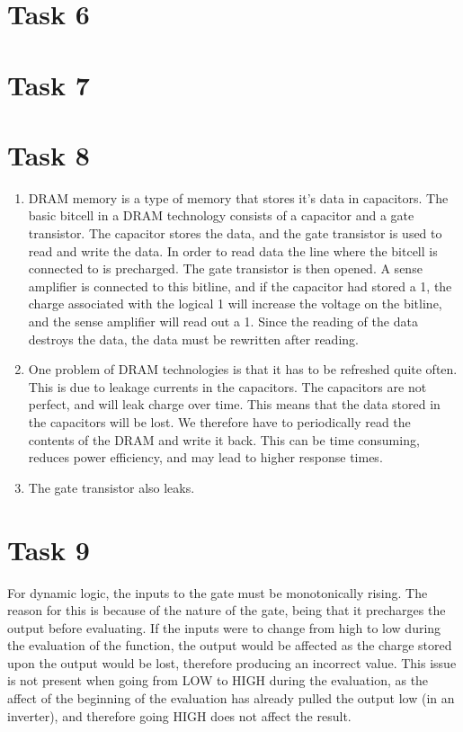 \documentclass[a4paper,11pt,norsk]{article}
\begin{document}
\section*{Task 6}

\section*{Task 7}

\section*{Task 8}
\begin{enumerate}
    \item DRAM memory is a type of memory that stores it's data in capacitors. The basic bitcell in a DRAM technology 
        consists of a capacitor and a gate transistor. The capacitor stores the data, and the gate transistor is used to
        read and write the data. In order to read data the line where the bitcell is connected to is precharged. The gate 
        transistor is then opened. A sense amplifier is connected to this bitline, and if the capacitor had stored a 1, the 
        charge associated with the logical 1 will increase the voltage on the bitline, and the sense amplifier will read out a 1.
        Since the reading of the data destroys the data, the data must be rewritten after reading. 
    \item One problem of DRAM technologies is that it has to be refreshed quite often. This is due to leakage currents in the 
        capacitors. The capacitors are not perfect, and will leak charge over time. This means that the data stored in the 
        capacitors will be lost. We therefore have to periodically read the contents of the DRAM and write it back. This can be 
        time consuming, reduces power efficiency, and may lead to higher response times.
    \item The gate transistor also leaks.
\end{enumerate}

\section*{Task 9}
For dynamic logic, the inputs to the gate must be monotonically rising. The reason for this is because of the nature 
of the gate, being that it precharges the output before evaluating. If the inputs were to change from high to low 
during the evaluation of the function, the output would be affected as the charge stored upon the output would be lost,
therefore producing an incorrect value. This issue is not present when going from LOW to HIGH during the evaluation, as 
the affect of the beginning of the evaluation has already pulled the output low (in an inverter), and therefore going HIGH
does not affect the result.
\end{document}
